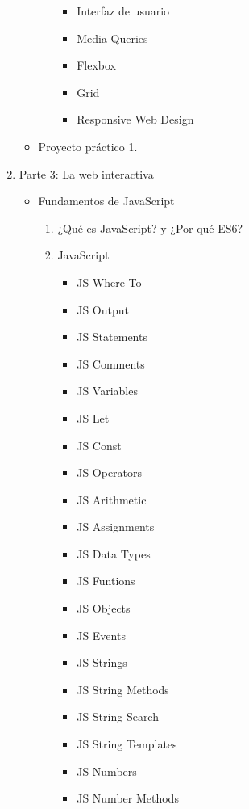 \documentclass[12pt, letterpaper]{article}
\begin{document}
\begin{enumerate}
\begin{itemize}
\begin{enumerate}
\begin{itemize}
                \item Interfaz de usuario
                \item Media Queries
                \item Flexbox
                \item Grid
                \item Responsive Web Design
            \end{itemize}
        \end{enumerate}        
        \item Proyecto práctico 1.
    \end{itemize}
    \item Parte 3: La web interactiva
    \begin{itemize}
        \item Fundamentos de JavaScript
        \begin{enumerate}
            \item ¿Qué es JavaScript? y ¿Por qué ES6?
            \item JavaScript
            \begin{itemize}
                \item JS Where To
                \item JS Output
                \item JS Statements
                \item JS Comments
                \item JS Variables
                \item JS Let
                \item JS Const
                \item JS Operators
                \item JS Arithmetic
                \item JS Assignments
                \item JS Data Types
                \item JS Funtions
                \item JS Objects
                \item JS Events
                \item JS Strings
                \item JS String Methods
                \item JS String Search
                \item JS String Templates
                \item JS Numbers
                \item JS Number Methods

\end{itemize}
\end{enumerate}
\end{itemize}
\end{enumerate}
\end{document}
